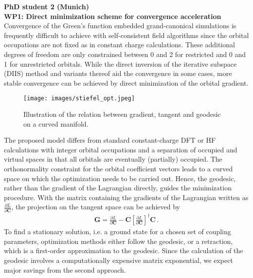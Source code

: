 \documentclass[a4paper,11pt,headings=normal]{scrartcl}
\begin{document}
\noindent
\textbf{PhD student 2 (Munich)}\\

\noindent
\textbf{WP1: Direct minimization scheme for convergence acceleration} 
Convergence of the Green's function embedded grand-canonical simulations is frequently difficult to achieve with self-consistent field algorithms since the orbital occupations are not fixed as in constant charge calculations. These additional degrees of freedom are only constrained between 0 and 2 for restricted and 0 and 1 for unrestricted orbitals. 
While the direct inversion of the iterative subspace (DIIS) method\autocite{Pulay1980,Pulay1982} and variants thereof\autocite{kudin2002,hu2010,garza2012} aid the convergence in some cases, more stable convergence can be achieved by direct minimization of the orbital gradient.\autocite{voorhis2002}\\
\begin{wrapfigure}{r}{0.5\textwidth}
	\centering
	\vspace{-1em}
	\texttt{[image: images/stiefel\_opt.jpeg]}
	\vspace{-2.5em}    
	\caption{Illustration of the relation between gradient, tangent and geodesic on a curved manifold.}
	\label{fig:stiefel}
  \vspace{-1em}  
\end{wrapfigure}\noindent
The proposed model differs from standard constant-charge DFT or HF calculations 
with integer orbital occupations and a separation of occupied and virtual spaces 
in that all orbitals are eventually (partially) occupied. The orthonormality 
constraint for the orbital coefficient vectors leads to a curved space on which 
the optimization needs to be carried out. Hence, the geodesic, rather than the 
gradient of the Lagrangian directly, guides the minimization procedure. With the 
matrix containing the gradients of the Lagrangian written as $\frac{\partial 
L}{\partial \mathbf{C}}$, the projection on the tangent space can be achieved 
by\autocite{edelman1989}
\begin{align}
\mathbf{G} = \frac{\partial L}{\partial \mathbf{C}} - \mathbf{C}\left[ \frac{\partial L}{\partial \mathbf{C}} \right]^\dagger \mathbf{C}\, .
\end{align}
To find a stationary solution, i.e. a ground state for a chosen set of coupling parameters, optimization methods either follow the geodesic, or a retraction, which is a first-order approximation to the geodesic.\autocite{gao2021} Since the calculation of the geodesic involves a computationally expensive matrix exponential, we expect major savings from the second approach.\\
\end{document}
